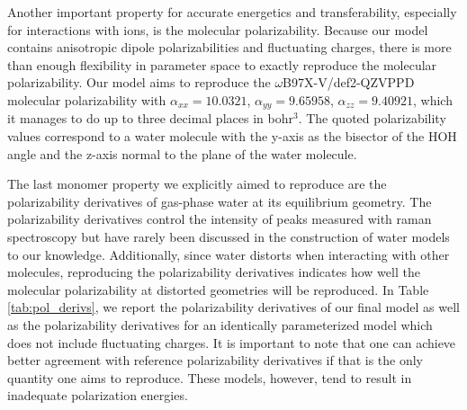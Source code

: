 \documentclass[journal=jctcce,manuscript=article]{achemso}
\begin{document}
Another important property for accurate energetics and transferability, especially for interactions with ions, is the molecular polarizability. Because our model contains anisotropic dipole polarizabilities and fluctuating charges, there is more than enough flexibility in parameter space to exactly reproduce the molecular polarizability. Our model aims to reproduce the $\omega$B97X-V/def2-QZVPPD molecular polarizability with $\alpha_{xx}=10.0321$, $\alpha_{yy}=9.65958$, $\alpha_{zz}=9.40921$, which it manages to do up to three decimal places in bohr$^3$. The quoted polarizability values correspond to a water molecule with the y-axis as the bisector of the HOH angle and the z-axis normal to the plane of the water molecule.

The last monomer property we explicitly aimed to reproduce are the polarizability derivatives of gas-phase water at its equilibrium geometry. The polarizability derivatives control the intensity of peaks measured with raman spectroscopy but have rarely been discussed in the construction of water models to our knowledge. Additionally, since water distorts when interacting with other molecules, reproducing the polarizability derivatives indicates how well the molecular polarizability at distorted geometries will be reproduced. In Table \ref{tab:pol_derivs}, we report the polarizability derivatives of our final model as well as the polarizability derivatives for an identically parameterized model which does not include fluctuating charges. It is important to note that one can achieve better agreement with reference polarizability derivatives if that is the only quantity one aims to reproduce. These models, however, tend to result in inadequate polarization energies.
\end{document}
